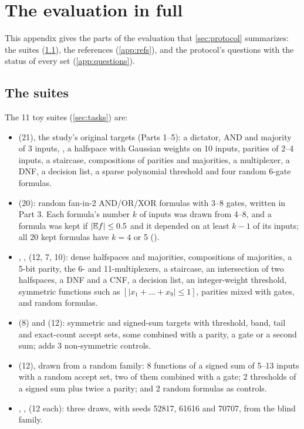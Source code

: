 \clearpage
\section{The evaluation in full}\label{app:eval}

This appendix gives the parts of the evaluation that \cref{sec:protocol} summarizes: the suites (\cref{app:suites}), the references (\cref{app:refs}), and the protocol's questions with the status of every set (\cref{app:questions}).

\subsection{The suites}\label{app:suites}

The 11 toy suites (\cref{sec:tasks}) are:
\begin{itemize}
\item {} (21), the study's original targets (Parts 1--5): a dictator, AND and majority of 3 inputs, , a halfspace with Gaussian weights on 10 inputs, parities of 2--4 inputs, a staircase, compositions of parities and majorities, a multiplexer, a DNF, a decision list, a sparse polynomial threshold and four random 6-gate formulas.
\item {} (20): random fan-in-2 AND/OR/XOR formulas with 3--8 gates, written in Part 3. Each formula's number $k$ of inputs was drawn from 4--8, and a formula was kept if $|\mathbb{E} f|\le0.5$ and it depended on at least $k-1$ of its inputs; all 20 kept formulas have $k=4$ or 5 ().
\item {}, ,  (12, 7, 10): dense halfspaces and majorities, compositions of majorities, a 5-bit parity, the 6- and 11-multiplexers, a staircase, an intersection of two halfspaces, a DNF and a CNF, a decision list, an integer-weight threshold, symmetric functions such as $[|x_1+\dots+x_9|\le1]$, parities mixed with gates, and random formulas.
\item {} (8) and  (12): symmetric and signed-sum targets with threshold, band, tail and exact-count accept sets, some combined with a parity, a gate or a second sum;  adds 3 non-symmetric controls.
\item {} (12), drawn from a random family: 8 functions of a signed sum of 5--13 inputs with a random accept set, two of them combined with a gate; 2 thresholds of a signed sum plus twice a parity; and 2 random formulas as controls.
\item {}, ,  (12 each): three draws, with seeds 52817, 61616 and 70707, from the blind family.
\end{itemize}

